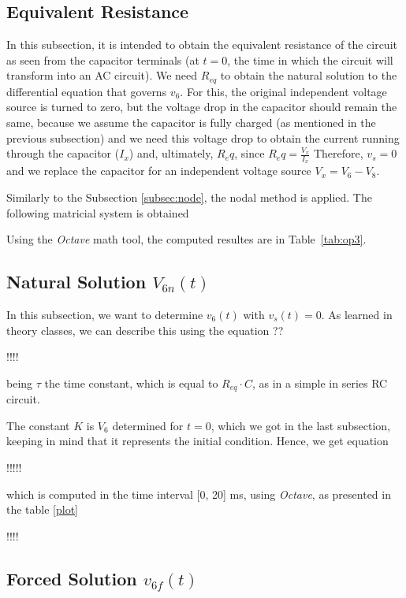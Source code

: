 \subsection{Equivalent Resistance}
\label{subsec:Nat_Sol_theory}

In this subsection, it is intended to obtain the equivalent resistance of the circuit as seen from the capacitor terminals (at $t=0$, the time in which the circuit will transform into an AC circuit). We need $R_{eq}$ to obtain the natural solution to the differential equation that governs $v_6$. For this, the original independent voltage source is turned to zero, but the voltage drop in the capacitor should remain the same, because we assume the capacitor is fully charged (as mentioned in the previous subsection) and we need this voltage drop to obtain the current running through the capacitor ($I_x$) and, ultimately, $R_eq$, since $R_eq = \frac{V_x}{I_x}$ Therefore, $v_s=0$ and we replace the capacitor for an independent voltage source $V_x = V_6 - V_8$.

Similarly to the Subsection \ref{subsec:node}, the nodal method is applied. The following matricial system is obtained



Using the \textit{Octave} math tool, the computed resultes are in Table~\ref{tab:op3}.

\subsection{Natural Solution $V_{6n}(t)$}
\label{subsec:Nat_Sol_theory}

In this subsection, we want to determine $v_6(t)$ with $v_s(t) = 0$. As learned in theory classes, we can describe this using the equation ??

!!!!

being $\tau$ the time constant, which is equal to $R_{eq} \cdot C$, as in a simple in series RC circuit. 

The constant $K$ is $V_6$ determined for $t=0$, which we got in the last subsection, keeping in mind that it represents the initial condition. Hence, we get equation 

!!!!!

which is computed in the time interval [0, 20] ms, using \textit{Octave}, as presented in the table \ref{plot}


!!!!

\subsection{Forced Solution $v_{6f}(t)$}
\label{subsec:Forced_Sol_theory}


